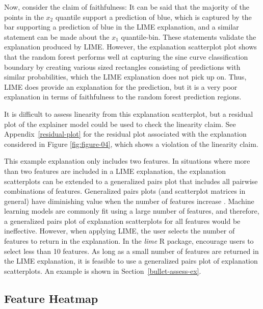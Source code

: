 \documentclass[AMS,STIX2COL]{WileyNJD-v2}\usepackage[]{graphicx}\usepackage[]{color}
\begin{document}
Now, consider the claim of faithfulness: It can be said that the majority of the points in the $x_2$ quantile support a prediction of blue, which is captured by the bar supporting a prediction of blue in the LIME explanation, and a similar statement can be made about the $x_1$ quantile-bin. These statements validate the explanation produced by LIME. However, the explanation scatterplot plot shows that the random forest performs well at capturing the sine curve classification boundary by creating various sized rectangles consisting of predictions with similar probabilities, which the LIME explanation does not pick up on. Thus, LIME does provide an explanation for the prediction, but it is a very poor explanation in terms of faithfulness to the random forest prediction regions.

It is difficult to assess linearity from this explanation scatterplot, but a residual plot of the explainer model could be used to check the linearity claim. See Appendix~\ref{residual-plot} for the residual plot associated with the explanation considered in Figure \ref{fig:figure-04}, which shows a violation of the linearity claim.

This example explanation only includes two features. In situations where more than two features are included in a LIME explanation, the explanation scatterplots can be extended to a generalized pairs plot \citep{emerson:2013} that includes all pairwise combinations of features. Generalized pairs plots (and scatterplot matrices in general) have diminishing value when the number of features increase \citep{jensen:2011} \citep{sweller:2011}. Machine learning models are commonly fit using a large number of features, and therefore, a generalized pairs plot of explanation scatterplots for all features would be ineffective. However, when applying LIME, the user selects the number of features to return in the explanation. In the \emph{lime} R package, \citet{pedersen:2020} encourage users to select less than 10 features. As long as a small number of features are returned in the LIME explanation,  it is feasible to use a generalized pairs plot of explanation scatterplots. An example is shown in Section~\ref{bullet-assess-ex}.

\subsection{Feature Heatmap} \label{feat-heat}
\end{document}

